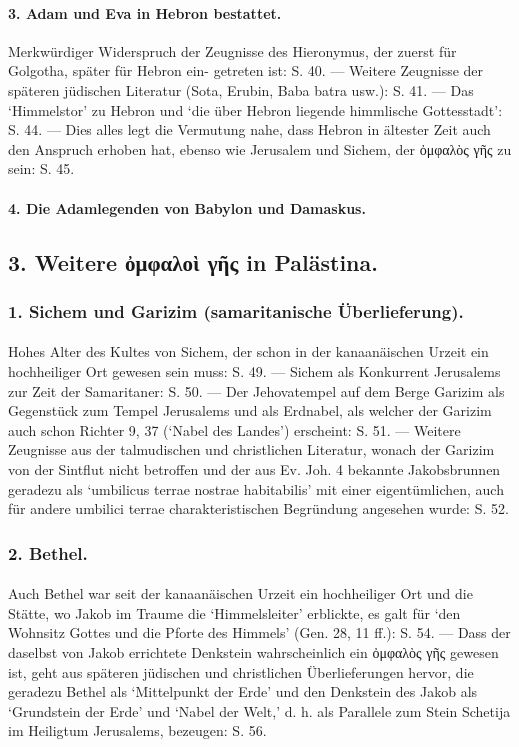 \documentclass[a4paper, 11pt, oneside]{article}
\begin{document}
\paragraph*{3. Adam und Eva in Hebron bestattet.}
Merkwürdiger Widerspruch der Zeugnisse des Hieronymus, der zuerst für Golgotha, später für Hebron ein- getreten ist: S. 40. --- Weitere Zeugnisse der späteren jüdischen Literatur (Sota, Erubin, Baba batra usw.): S. 41. --- Das `Himmelstor' zu Hebron und `die über Hebron liegende himmlische Gottesstadt': S. 44. --- Dies alles legt die Vermutung nahe, dass Hebron in ältester Zeit auch den Anspruch erhoben hat, ebenso wie Jerusalem und Sichem, der ὀμφαλὸς γῆς zu sein: S. 45.

\paragraph*{4. Die Adamlegenden von Babylon und Damaskus.}
\subsection*{3. Weitere ὀμφαλοὶ γῆς in Palästina.}
\subsubsection*{1. Sichem und Garizim (samaritanische Überlieferung).}
\paragraph{}
Hohes Alter des Kultes von Sichem, der schon in der kanaanäischen Urzeit ein hochheiliger Ort gewesen sein muss: S. 49. --- Sichem als Konkurrent Jerusalems zur Zeit der Samaritaner: S. 50. --- Der Jehovatempel auf dem Berge Garizim als Gegenstück zum Tempel Jerusalems und als Erdnabel, als welcher der Garizim auch schon Richter 9, 37 (`Nabel des Landes') erscheint: S. 51. --- Weitere Zeugnisse aus der talmudischen und christlichen Literatur, wonach der Garizim von der Sintflut nicht betroffen und der aus Ev. Joh. 4 bekannte Jakobsbrunnen geradezu als `umbilicus terrae nostrae habitabilis' mit einer eigentümlichen, auch für andere umbilici terrae charakteristischen Begründung angesehen wurde: S. 52.

\subsubsection*{2. Bethel.}
\paragraph{}
Auch Bethel war seit der kanaanäischen Urzeit ein hochheiliger Ort und die Stätte, wo Jakob im Traume die `Himmelsleiter' erblickte, es galt für `den Wohnsitz Gottes und die Pforte des Himmels' (Gen. 28, 11 ff.): S. 54. --- Dass der daselbst von Jakob errichtete Denkstein wahrscheinlich ein ὀμφαλὸς γῆς gewesen ist, geht aus späteren jüdischen und christlichen Überlieferungen hervor, die geradezu Bethel als `Mittelpunkt der Erde' und den Denkstein des Jakob als `Grundstein der Erde' und `Nabel der Welt,' d. h. als Parallele zum Stein Schetija im Heiligtum Jerusalems, bezeugen: S. 56.
\end{document}
